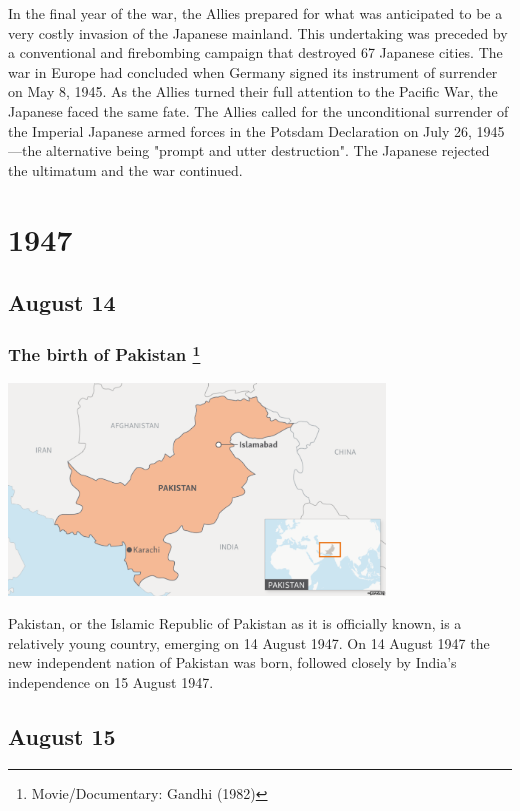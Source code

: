 \documentclass[11pt]{report}
\begin{document}
In the final year of the war, the Allies prepared for what was anticipated to be a very costly invasion of the Japanese mainland. This undertaking was preceded by a conventional and firebombing campaign that destroyed 67 Japanese cities. The war in Europe had concluded when Germany signed its instrument of surrender on May 8, 1945. As the Allies turned their full attention to the Pacific War, the Japanese faced the same fate. The Allies called for the unconditional surrender of the Imperial Japanese armed forces in the Potsdam Declaration on July 26, 1945—the alternative being "prompt and utter destruction". The Japanese rejected the ultimatum and the war continued.

\chapter{1947}
\section{August 14}
\subsection{The birth of Pakistan \protect\footnote{Movie/Documentary: Gandhi (1982)}}
\vspace{2mm}\begin{center}\includegraphics[width=10cm]{./img/pakistan.png}\end{center}
Pakistan, or the Islamic Republic of Pakistan as it is officially known, is a relatively young country, emerging on 14 August 1947. On 14 August 1947 the new independent nation of Pakistan was born, followed closely by India's independence on 15 August 1947.

\section{August 15}
\end{document}
